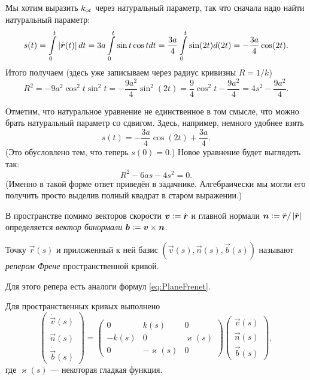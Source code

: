 \begin{solution}
	Мы хотим выразить $k_{\Or}$ через натуральный параметр, так что сначала надо найти натуральный параметр:
	\[
		s(t) = \int\limits_0^t\abs{\dot{\vec{r}}(t)}dt = 3a\int\limits_0^t\sin t\cos tdt = \frac{3a}{4}\int\limits_0^t\sin(2t) d(2t) = -\frac{3a}{4}\cos(2t).
	\]
	Итого получаем (здесь уже записываем через радиус кривизны $R = 1 / k$)
	\[
		R^2 = -9a^2\cos^2t\sin^2t = -\frac{9a^2}{4}\sin^2(2t) = \frac{9}{4}\cos^2t - \frac{9a^2}{4} = 4s^2 - \frac{9a^2}{4}.
	\]

	Отметим, что натуральное уравнение не единственное в том смысле, что можно брать натуральный параметр со сдвигом. Здесь, например, немного удобнее взять
	\[
		s(t) = -\frac{3a}{4}\cos(2t) + \frac{3a}{4}.
	\]
	(Это обусловлено тем, что теперь $s(0) = 0$.) Новое уравнение будет выглядеть так:
	\[
		R^2 - 6as - 4s^2 = 0.
	\]
	(Именно в такой форме ответ приведён в задачнике. Алгебраически мы могли его получить просто выделив полный квадрат в старом выражении.)
\end{solution}

В пространстве помимо векторов скорости $\vec{v} \vcentcolon = \dot{\vec{r}}$ и главной нормали $\vec{n} \vcentcolon = \ddot{\vec{r}} / \abs{\ddot{\vec{r}}}$ определяется \textit{вектор бинормали} $\vec{b} \vcentcolon = \vec{v} \times \vec{n}$.

\begin{definition}
	Точку $\vec{r}(s)$ и приложенный к ней базис $(\vec{v}(s), \vec{n}(s), \vec{b}(s))$ называют \textit{репером Френе} пространственной кривой.
\end{definition}

Для этого репера есть аналоги формул \eqref{eq:PlaneFrenet}.

\begin{theorem}
	Для пространственных кривых выполнено
	\begin{equation} \label{eq:SpaceFrenet}
		\begin{pmatrix}
			\dot{\vec{v}}(s) \\ \dot{\vec{n}}(s) \\ \dot{\vec{b}}(s)
		\end{pmatrix} = 
		\begin{pmatrix}
			0 & k(s) & 0 \\
			-k(s) & 0 & \varkappa(s) \\
			0 & -\varkappa(s) & 0
		\end{pmatrix}
		\begin{pmatrix}
			\vec{v}(s) \\ \vec{n}(s) \\ \vec{b}(s)
		\end{pmatrix},
	\end{equation}
	где $\varkappa(s)$ --- некоторая гладкая функция.
\end{theorem}

